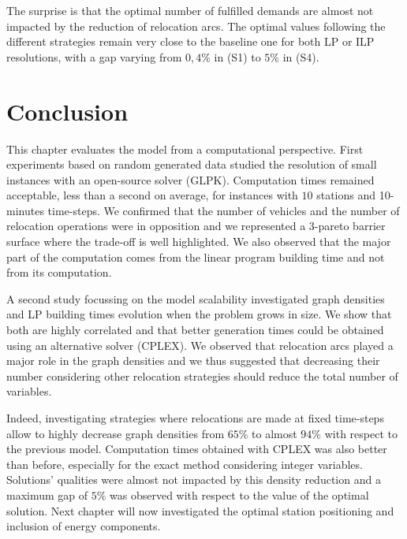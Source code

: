 \bigskip
The surprise is that the optimal number of fulfilled demands are almost not impacted by the reduction of relocation arcs.
The optimal values following  the different strategies remain very close to the baseline one for both LP or ILP resolutions,
with a gap varying from $0,4$\% in (S1) to $5$\% in (S4).

\section{Conclusion}

This chapter evaluates the {\SDP} model from a computational perspective.
First experiments based on random generated data studied the resolution of small instances with an open-source solver (GLPK).
Computation times remained acceptable, less than a second on average, for instances with $10$ stations and 10-minutes time-steps.
We confirmed that the number of vehicles and the number of relocation operations were in opposition and we represented a 3-pareto barrier surface where the trade-off is well highlighted.
We also observed that the major part of the computation comes from the linear program building time and not from its computation.

\medskip
A second study focussing on the model scalability investigated graph densities and LP building times evolution when the problem grows in size.
We show that both are highly correlated and that better generation times could be obtained using an alternative solver (CPLEX).
We observed that relocation arcs played a major role in the graph densities and we thus suggested that decreasing their number considering other relocation strategies should reduce the total number of variables.

\medskip
Indeed, investigating strategies where relocations are made at fixed time-steps allow to highly decrease graph densities from $65$\% to almost $94$\% with respect to the previous model.
Computation times obtained with CPLEX was also better than before, especially for the exact method considering integer variables.
Solutions' qualities were almost not impacted by this density reduction and a maximum gap of $5$\% was observed with respect to the value of the optimal solution.
Next chapter will now investigated the optimal station positioning and inclusion of energy components.

\newpage
{}
\renewcommand{\bibname}{Bibliography of chapter \thechapter}



